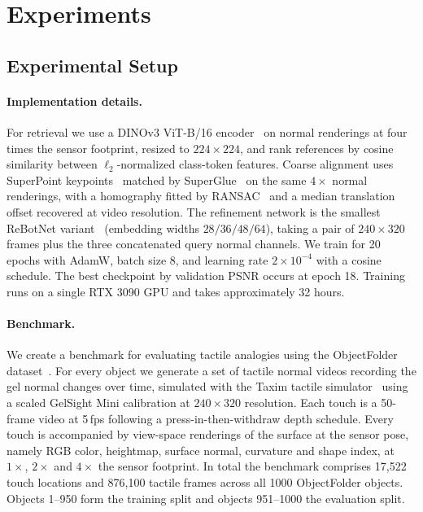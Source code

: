 \section{Experiments}
\label{sec:exp}

\subsection{Experimental Setup}

\paragraph{Implementation details.}
For retrieval we use a DINOv3 ViT-B/16 encoder~\cite{dinov3} on normal renderings at four times
the sensor footprint, resized to $224\times224$, and rank references by cosine similarity between
$\ell_2$-normalized class-token features. Coarse alignment uses SuperPoint
keypoints~\cite{superpoint} matched by SuperGlue~\cite{superglue} on the same $4\times$ normal
renderings, with a homography fitted by RANSAC~\cite{ransac} and a median translation offset
recovered at video resolution. The refinement network is the smallest ReBotNet
variant~\cite{rebotnet} (embedding widths $28/36/48/64$), taking a pair of $240\times320$ frames
plus the three concatenated query normal channels. We train for 20 epochs with AdamW, batch size
8, and learning rate $2\times10^{-4}$ with a cosine schedule. The best checkpoint
by validation PSNR occurs at epoch 18. Training runs on a single RTX 3090 GPU and takes
approximately 32 hours.

\paragraph{Benchmark.}
We create a benchmark for evaluating tactile analogies using the ObjectFolder
dataset~\cite{objectfolder}. For every object we generate a set of tactile normal videos recording
the gel normal changes over time, simulated with the Taxim tactile simulator~\cite{taxim} using a
scaled GelSight Mini calibration at $240\times320$ resolution. Each touch is a 50-frame video at
5\,fps following a press-in-then-withdraw depth schedule. Every touch is accompanied by
view-space renderings of the surface at the sensor pose, namely RGB color, heightmap, surface
normal, curvature and shape index, at $1\times$, $2\times$ and $4\times$ the sensor footprint. In total
the benchmark comprises 17{,}522 touch locations and 876{,}100 tactile frames across all 1000
ObjectFolder objects. Objects 1--950 form the training split and objects 951--1000 the evaluation
split.

